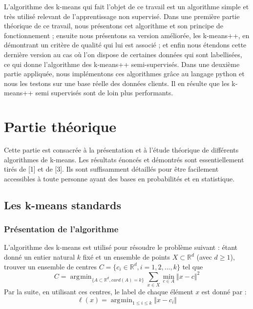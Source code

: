 \documentclass[12pt,a4paper]{book}
\newcommand{\R}{\mathbb{R}}
\newcommand{\1}{\mathds{1}}
\DeclareMathOperator*{\argmin}{arg\!\min}
\begin{document}
L'algorithme des k-means qui fait l'objet de ce travail est un algorithme simple et très utilisé relevant de l'apprentissage non supervisé. Dans une première partie théorique de ce travail, nous présentons cet algorithme et son principe de fonctionnement ; ensuite nous présentons sa version améliorée, les k-means++, en démontrant un critère de qualité qui lui est associé ; et enfin nous étendons cette dernière version au cas où l'on dispose de certaines données qui sont labellisées, ce qui donne l'algorithme des k-means++ semi-supervisés. Dans une deuxième partie appliquée, nous implémentons ces algorithmes grâce au langage python et nous les testons sur une base réelle des données clients. Il en résulte que les k-means++ semi supervisés sont de loin plus performants.





\section{Partie théorique}

Cette partie est consacrée à la présentation et à l'étude théorique de différents algorithmes de k-means. Les  résultats énoncés et démontrés sont essentiellement tirés de [1] et de [3]. Ils sont suffisamment détaillés pour être facilement accessibles à toute personne ayant des bases en probabilités et en statistique.

\subsection{Les k-means standards}

\subsubsection{Présentation de l'algorithme}

L'algorithme des k-means est utilisé pour résoudre le problème suivant : étant donné un entier natural $k$ fixé et un ensemble de points $X \subset \R^d$ (avec $d \geq 1$), trouver un ensemble de centres $C = \{ c_i \in \R^d, i=1,2,...,k \}$ tel que 
\begin{equation}\label{probleme_kmeans}
	C = \argmin_{\{ A \subset \R^d, card(A)=k \}}\sum_{x \in X} \min_{c \in A} \Vert x-c \Vert^2
\end{equation}
Par la suite, en utilisant ces centres, le label de chaque élément $x$ est donné par :
$$
	\ell (x) = \argmin_{1 \leq i \leq k} \Vert x - c_i \Vert
$$
\end{document}
